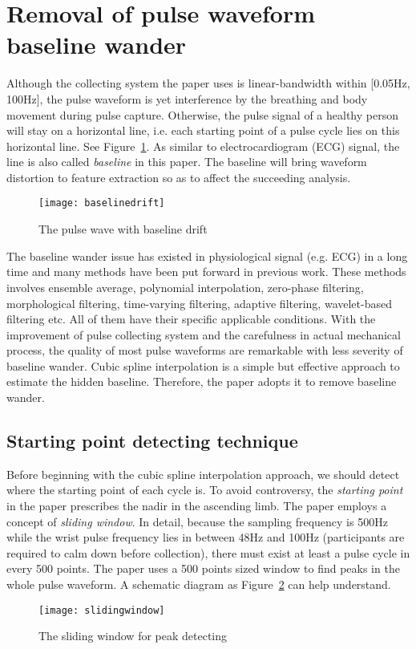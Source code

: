 \section{Removal of pulse waveform baseline wander}
Although the collecting system the paper uses is linear-bandwidth
within [0.05Hz, 100Hz], the pulse waveform is yet interference by the
breathing and body movement during pulse capture. Otherwise, the pulse
signal of a healthy person will stay on a horizontal line, i.e. each
starting point of a pulse cycle lies on this horizontal line. See Figure~\ref{fig:baselinedrift}. As
similar to electrocardiogram (ECG) signal, the line is also called
\emph{baseline} in this paper. The baseline will bring waveform
distortion to feature extraction so as to affect the succeeding
analysis.~\cite{li1999study,allen2000variability} 
\begin{figure}[htbp]
    \begin{center}
        \texttt{[image: baselinedrift]}
    \end{center}
    \caption{The pulse wave with baseline drift}
    \label{fig:baselinedrift}
\end{figure}

The baseline wander issue has existed in physiological signal (e.g.
ECG) in a long time and many methods have been put forward in previous
work. These methods involves ensemble average, polynomial interpolation,
zero-phase filtering, morphological filtering, time-varying filtering,
adaptive filtering, wavelet-based filtering etc. All of them have
their specific applicable conditions. With the improvement of pulse
collecting system and the carefulness in actual mechanical process,
the quality of most pulse waveforms are remarkable with less severity
of baseline wander. Cubic spline interpolation is a simple but
effective approach to estimate the hidden baseline. Therefore, the
paper adopts it to remove baseline wander. 

\subsection{Starting point detecting technique}
\label{sec:startpoint}

Before beginning with the cubic spline interpolation approach, we
should detect where the starting point of each cycle is. To avoid
controversy, the \emph{starting point} in the paper prescribes the
nadir in the ascending limb. The paper employs a concept of
\emph{sliding window}. In detail, because the sampling frequency is
500Hz while the wrist pulse frequency lies in between 48Hz and 100Hz
(participants are required to calm down before collection), there must
exist at least a pulse cycle in every 500 points. The paper uses a
500 points sized window to find peaks in the whole pulse waveform. A
schematic diagram as Figure~\ref{fig:slidingwindow} can help understand. 
\begin{figure}[htpb]
    \begin{center}
        \texttt{[image: slidingwindow]}
    \end{center}
    \caption{The sliding window for peak detecting}
    \label{fig:slidingwindow}
\end{figure}

